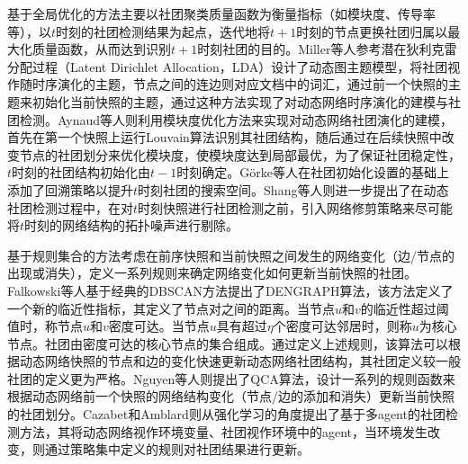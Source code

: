 基于全局优化的方法主要以社团聚类质量函数为衡量指标（如模块度、传导率等），以$t$时刻的社团检测结果为起点，迭代地将$t+1$时刻的节点更换社团归属以最大化质量函数，从而达到识别$t+1$时刻社团的目的。Miller等人\cite{miller2010continuous}参考潜在狄利克雷分配过程（Latent Dirichlet Allocation，LDA）设计了动态图主题模型，将社团视作随时序演化的主题，节点之间的连边则对应文档中的词汇，通过前一个快照的主题来初始化当前快照的主题，通过这种方法实现了对动态网络时序演化的建模与社团检测。Aynaud等人则利用模块度优化方法来实现对动态网络社团演化的建模，首先在第一个快照上运行Louvain算法识别其社团结构，随后通过在后续快照中改变节点的社团划分来优化模块度，使模块度达到局部最优，为了保证社团稳定性，$t$时刻的社团结构初始化由$t-1$时刻确定。G{\"o}rke等人\cite{gorke2010modularity}在社团初始化设置的基础上添加了回溯策略以提升$t$时刻社团的搜索空间。Shang等人\cite{shang2014real}则进一步提出了在动态社团检测过程中，在对$t$时刻快照进行社团检测之前，引入网络修剪策略来尽可能将$t$时刻的网络结构的拓扑噪声进行剔除。  

基于规则集合的方法考虑在前序快照和当前快照之间发生的网络变化（边/节点的出现或消失），定义一系列规则来确定网络变化如何更新当前快照的社团。Falkowski等人\cite{falkowski2008studying}基于经典的DBSCAN方法提出了DENGRAPH算法，该方法定义了一个新的临近性指标，其定义了节点对之间的距离。当节点$u$和$v$的临近性超过阈值时，称节点$u$和$v$密度可达。当节点$u$具有超过$\eta$个密度可达邻居时，则称$u$为核心节点。社团由密度可达的核心节点的集合组成。通过定义上述规则，该算法可以根据动态网络快照的节点和边的变化快速更新动态网络社团结构，其社团定义较一般社团的定义更为严格。Nguyen等人\cite{nguyen2011adaptive}则提出了QCA算法，设计一系列的规则函数来根据动态网络前一个快照的网络结构变化（节点/边的添加和消失）更新当前快照的社团划分。Cazabet和Amblard\cite{cazabet2011simulate}则从强化学习的角度提出了基于多agent的社团检测方法，其将动态网络视作环境变量、社团视作环境中的agent，当环境发生改变，则通过策略集中定义的规则对社团结果进行更新。

